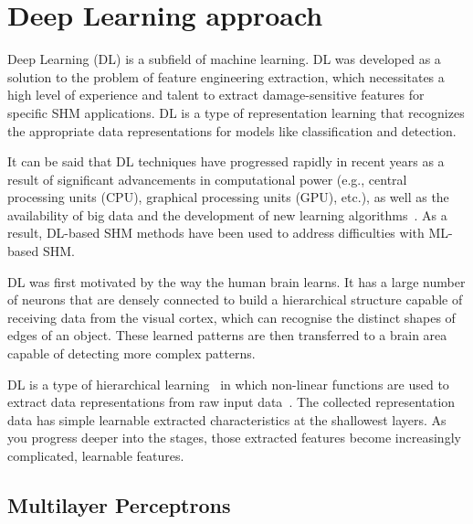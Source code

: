 \section{Deep Learning approach}
\label{sec32}

Deep Learning (DL) is a subfield of machine learning.
DL was developed as a solution to the problem of feature engineering extraction, which necessitates a high level of experience and talent to extract damage-sensitive features for specific SHM applications.
DL is a type of representation learning that recognizes the appropriate data representa\-tions for models like classification and detection.

It can be said that DL techniques have progressed rapidly in recent years as a result of significant advancements in computational power (e.g., central processing units (CPU), graphical processing units (GPU), etc.), as well as the availability of big data and the development of new learning algorithms~\cite{Yuan2020}.
As a result, DL-based SHM methods have been used to address difficulties with ML-based SHM.

DL was first motivated by the way the human brain learns.
It has a large number of neurons that are densely connected to build a hierarchical structure capable of receiving data from the visual cortex, which can recognise the distinct shapes of edges of an object.
These learned patterns are then transferred to a brain area capable of detecting more complex patterns.

DL is a type of hierarchical learning~\cite{Ongsulee2018} in which non-linear functions are used to extract data representations from raw input data~\cite{Lecun2015}.
The collected representation data has simple learnable extracted characteristics at the shallowest layers.
As you progress deeper into the stages, those extracted features become increasingly complica\-ted, learnable features.

\subsection{Multilayer Perceptrons}

